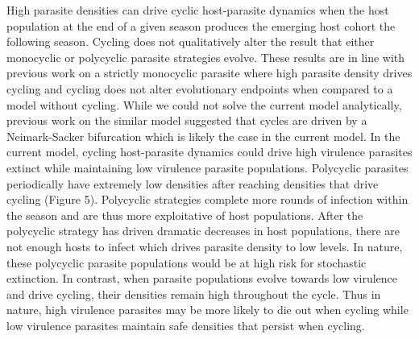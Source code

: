 \documentclass{article}
\begin{document}
High parasite densities can drive cyclic host-parasite dynamics when the host population at the end of a given season produces the emerging host cohort the following season. Cycling does not qualitatively alter the result that either monocyclic or polycyclic parasite strategies evolve. These results are in line with previous work on a strictly monocyclic parasite where high parasite density drives cycling and cycling does not alter evolutionary endpoints when compared to a model without cycling\cite{macdonald2021host}. While we could not solve the current model analytically, previous work on the similar model suggested that cycles are driven by a Neimark-Sacker bifurcation which is likely the case in the current model. In the current model, cycling host-parasite dynamics could drive high virulence parasites extinct while maintaining low virulence parasite populations. Polycyclic parasites periodically have extremely low densities after reaching densities that drive cycling (Figure 5). Polycyclic strategies complete more rounds of infection within the season and are thus more exploitative of host populations. After the polycyclic strategy has driven dramatic decreases in host populations, there are not enough hosts to infect which drives parasite density to low levels. In nature, these polycyclic parasite populations would be at high risk for stochastic extinction. In contrast, when parasite populations evolve towards low virulence and drive cycling, their densities remain high throughout the cycle. Thus in nature, high virulence parasites may be more likely to die out when cycling while low virulence parasites maintain safe densities that persist when cycling.

\end{document}
